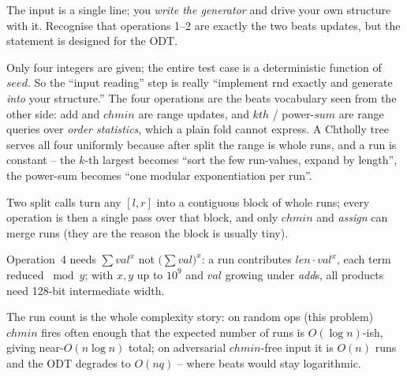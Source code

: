 \begin{attemptgate}
The input is a single line; you \emph{write the generator} and drive your own
structure with it.  Recognise that operations 1--2 are exactly the two beats
updates, but the statement is designed for the ODT.
\end{attemptgate}

Only four integers are given; the entire test case is a deterministic function of
\(\mathit{seed}\).  So the ``input reading'' step is really ``implement
\(\mathrm{rnd}\) exactly and generate \emph{into} your structure.''  The four
operations are the beats vocabulary seen from the other side: add and \(\mathit{chmin}\)
are range updates, and \(\mathit{kth}\) / power-\(\mathit{sum}\) are range queries
over \emph{order statistics}, which a plain fold cannot express.  A Chtholly tree
serves all four uniformly because after \(\mathrm{split}\) the range is whole runs,
and a run is constant -- the \(k\)-th largest becomes ``sort the few run-values,
expand by length'', the power-sum becomes ``one modular exponentiation per run''.

\begin{observation}
Two \(\mathrm{split}\) calls turn any \([l,r]\) into a contiguous block of whole
runs; every operation is then a single pass over that block, and only
\(\mathit{chmin}\) and \emph{assign} can merge runs (they are the reason the block
is usually tiny).
\end{observation}
\begin{observation}
Operation~4 needs \(\sum \mathit{val}^x\) not \(\big(\sum\mathit{val}\big)^x\): a run
contributes \(\mathit{len}\cdot\mathit{val}^{x}\), each term reduced \(\bmod y\);
with \(x,y\) up to \(10^9\) and \(\mathit{val}\) growing under \emph{add}s, all
products need 128-bit intermediate width.
\end{observation}
\begin{observation}
The run count is the whole complexity story: on random ops (this problem)
\(\mathit{chmin}\) fires often enough that the expected number of runs is
\(O(\log n)\)-ish, giving near-\(O(n\log n)\) total; on adversarial \(\mathit{chmin}\)-free
input it is \(O(n)\) runs and the ODT degrades to \(O(nq)\) -- where beats would
stay logarithmic.
\end{observation}

